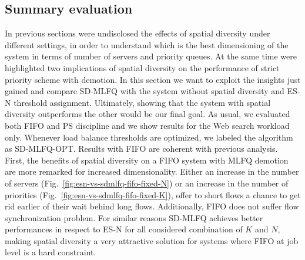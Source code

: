 \subsection{Summary evaluation}
\label{sec:final-comparison}
In previous sections were undisclosed the effects of spatial diversity under different settings, in order to understand which is the best dimensioning of the system in terms of number of servers and priority queues. At the same time were highlighted two implications of spatial diversity on the performance of strict priority scheme with demotion. In this section we want to exploit the insights just gained and compare SD-MLFQ with the system without spatial diversity and ES-N threshold assignment. Ultimately, showing that the system with spatial diversity outperforms the other would be our final goal. As usual, we evaluated both FIFO and PS discipline and we show results for the Web search workload only. Whenever load balance thresholds are optimized, we labeled the algorithm as SD-MLFQ-OPT. Results with FIFO are coherent with previous analysis. \\
First, the benefits of spatial diversity on a FIFO system with MLFQ demotion are more remarked for increased dimensionality. Either an increase in the number of servers (Fig.~\ref{fig:esn-vs-sdmlfq-fifo-fixed-N}) or an increase in the number of priorities (Fig.~\ref{fig:esn-vs-sdmlfq-fifo-fixed-K}), offer to short flows a chance to get rid earlier of their wait behind long flows. Additionally, FIFO does not suffer flow synchronization problem. For similar reasons SD-MLFQ achieves better performances in respect to ES-N for all considered combination of $K$ and $N$, making spatial diversity a very attractive solution for systems where FIFO at job level is a hard constraint.
